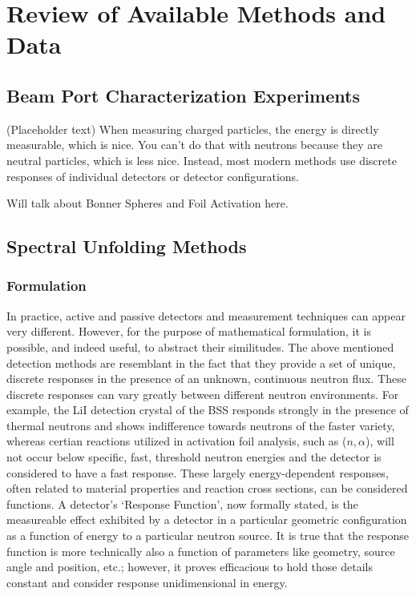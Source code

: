 \cleardoublepage

\chapter{Review of Available Methods and Data}


\section{Beam Port Characterization Experiments}

(Placeholder text)
When measuring charged particles, the energy is directly measurable, which is nice.
You can't do that with neutrons because they are neutral particles, which is less nice.
Instead, most modern methods use discrete responses of individual detectors or detector configurations.

Will talk about Bonner Spheres and Foil Activation here.

\section{Spectral Unfolding Methods}


\subsection{Formulation}


In practice, active and passive detectors and measurement techniques can appear very different.
However, for the purpose of mathematical formulation, it is possible, and indeed useful, to abstract their similitudes.
The above mentioned detection methods are resemblant in the fact that they provide a set of unique, discrete responses in the presence of an unknown, continuous neutron flux.
These discrete responses can vary greatly between different neutron environments.
For example, the LiI detection crystal of the BSS responds strongly in the presence of thermal neutrons and shows indifference towards neutrons of the faster variety, whereas certian reactions utilized in activation foil analysis, such as ($n, \alpha$), will not occur below specific, fast, threshold neutron energies and the detector is considered to have a fast response.
These largely energy-dependent responses, often related to material properties and reaction cross sections, can be considered functions.
A detector's `Response Function', now formally stated, is the measureable effect exhibited by a detector in a particular geometric configuration as a function of energy to a particular neutron source.
It is true that the response function is more technically also a function of parameters like geometry, source angle and position, etc.; however, it proves efficacious to hold those details constant and consider response unidimensional in energy.




